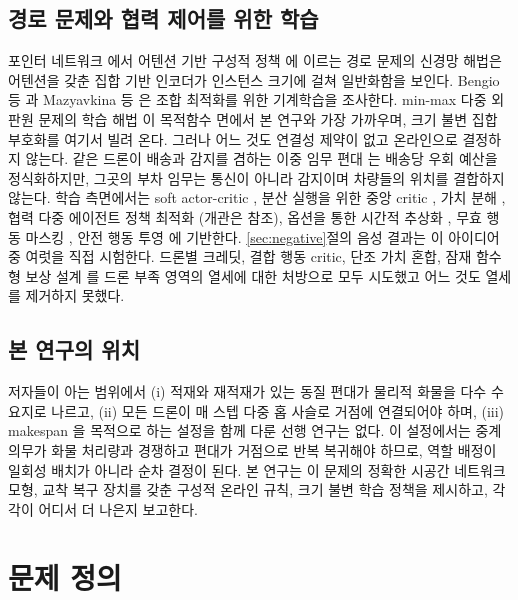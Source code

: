 \documentclass[final,5p,times,twocolumn]{elsarticle}
\begin{document}
\subsection{경로 문제와 협력 제어를 위한 학습}
\label{sec:rel-learning}
포인터 네트워크 \cite{vinyals2015}에서 어텐션 기반 구성적 정책 \cite{nazari2018,kool2019}에
이르는 경로 문제의 신경망 해법은 어텐션을 갖춘 집합 기반 인코더가 인스턴스 크기에 걸쳐 일반화함을
보인다. Bengio 등 \cite{bengio2021}과 Mazyavkina 등 \cite{mazyavkina2021}은 조합 최적화를 위한
기계학습을 조사한다. min-max 다중 외판원 문제의 학습 해법 \cite{park2023,guo2024}이 목적함수 면에서
본 연구와 가장 가까우며, 크기 불변 집합 부호화를 여기서 빌려 온다. 그러나 어느 것도 연결성 제약이
없고 온라인으로 결정하지 않는다. 같은 드론이 배송과 감지를 겸하는 이중 임무 편대 \cite{zhu2026}는
배송당 우회 예산을 정식화하지만, 그곳의 부차 임무는 통신이 아니라 감지이며 차량들의 위치를
결합하지 않는다. 학습 측면에서는 soft actor-critic \cite{haarnoja2018}, 분산 실행을 위한 중앙
critic \cite{lowe2017,foerster2018}, 가치 분해 \cite{sunehag2018,rashid2018}, 협력 다중 에이전트
정책 최적화 \cite{yu2022}(개관은 \cite{oroojlooy2023} 참조), 옵션을 통한 시간적 추상화
\cite{sutton1999,bacon2017,vezhnevets2017}, 무효 행동 마스킹 \cite{huang2022}, 안전 행동 투영
\cite{dalal2018}에 기반한다. \ref{sec:negative}절의 음성 결과는 이 아이디어 중 여럿을 직접
시험한다. 드론별 크레딧, 결합 행동 critic, 단조 가치 혼합, 잠재 함수형 보상 설계 \cite{ng1999}를
드론 부족 영역의 열세에 대한 처방으로 모두 시도했고 어느 것도 열세를 제거하지 못했다.

\subsection{본 연구의 위치}
\label{sec:rel-position}
저자들이 아는 범위에서 (i) 적재와 재적재가 있는 동질 편대가 물리적 화물을 다수 수요지로 나르고,
(ii) 모든 드론이 매 스텝 다중 홉 사슬로 거점에 연결되어야 하며, (iii) makespan 을 목적으로 하는
설정을 함께 다룬 선행 연구는 없다. 이 설정에서는 중계 의무가 화물 처리량과 경쟁하고 편대가
거점으로 반복 복귀해야 하므로, 역할 배정이 일회성 배치가 아니라 순차 결정이 된다. 본 연구는 이
문제의 정확한 시공간 네트워크 모형, 교착 복구 장치를 갖춘 구성적 온라인 규칙, 크기 불변 학습
정책을 제시하고, 각각이 어디서 더 나은지 보고한다.

\section{문제 정의}
\label{sec:problem}
\end{document}
